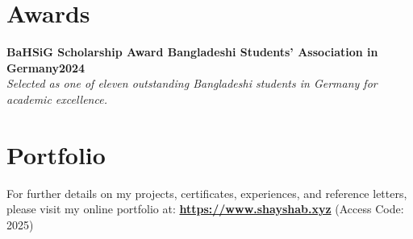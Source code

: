 \documentclass[letterpaper,10pt]{article}
\newcommand{\heading}[2]{
  \hspace{10pt}#1\hfill#2\\
}
\newcommand{\headingBf}[2]{
  \heading{\textbf{#1}}{\textbf{#2}}
}
\newcommand{\headingIt}[2]{
  \heading{\textit{#1}}{\textit{#2}}
}
\begin{document}
\vspace{-0.5em}

\section{Awards}

\headingBf{BaHSiG Scholarship Award \textnormal{Bangladeshi Students' Association in Germany}}{2024}
\headingIt{Selected as one of eleven outstanding Bangladeshi students in Germany for academic excellence.}{}

\vspace{-0.5em}

\section*{Portfolio}

For further details on my projects, certificates, experiences, and reference letters, please visit my online portfolio at: \textbf{\href{https://www.shayshab.xyz/}{https://www.shayshab.xyz}} (Access Code: 2025)
\end{document}
